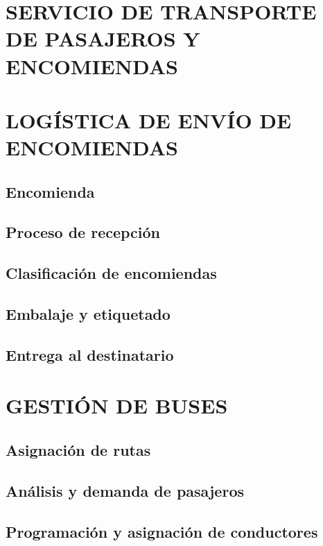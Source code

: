 	\section{SERVICIO DE TRANSPORTE DE PASAJEROS Y ENCOMIENDAS}
	\section{LOGÍSTICA DE ENVÍO DE ENCOMIENDAS}
	\subsection{Encomienda}
	\subsection{Proceso de recepción}
	\subsection{Clasificación de encomiendas}
	\subsection{Embalaje y etiquetado}
	\subsection{Entrega al destinatario}
	\section{GESTIÓN DE BUSES}
	\subsection{Asignación de rutas}
	\subsection{Análisis y demanda de pasajeros}
	\subsection{Programación y asignación de conductores}
	
	
		
		

